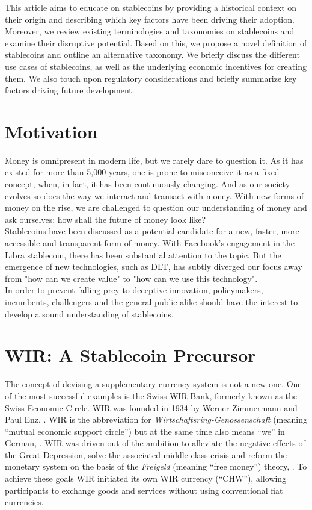 \documentclass[conference]{IEEEtran}
\begin{document}
This article aims to educate on stablecoins by providing a historical context on their origin and describing  which key factors have been driving their adoption. Moreover, we review existing terminologies and taxonomies on stablecoins and examine their disruptive potential. Based on this, we propose a novel definition of stablecoins and outline an alternative taxonomy. We briefly discuss the different use cases of stablecoins, as well as the underlying economic incentives for creating them. We also touch upon regulatory considerations and briefly summarize key factors driving future development.

\section{Motivation}
Money is omnipresent in modern life, but we rarely dare to question it. As it has existed for more than 5,000 years, one is prone to misconceive it as a fixed concept, when, in fact, it has been continuously changing. And as our society evolves so does the way we interact and transact with money. With new forms of money on the rise, we are challenged to question our understanding of money and ask ourselves: how shall the future of money look like?\\

Stablecoins have been discussed as a potential candidate for a new, faster, more accessible and transparent form of money. With Facebook's engagement in the Libra stablecoin, there has been substantial attention to the topic. But the emergence of new technologies, such as \ac{DLT}, has subtly diverged our focus away from "how can we create value" to "how can we use this technology".\\

In order to prevent falling prey to deceptive innovation, policymakers, incumbents, challengers and the general public alike should have the interest to develop a sound understanding of stablecoins. 

\section{WIR: A Stablecoin Precursor}
The concept of devising a supplementary currency system is not a new one. One of the most successful examples is the Swiss WIR Bank, formerly known as the Swiss Economic Circle. WIR was founded in 1934 by Werner Zimmermann and Paul Enz, \cite{Orell}. WIR is the abbreviation for \textit{Wirtschaftsring-Genossenschaft} (meaning ``mutual economic support circle'') but at the same time also means ``we'' in German, \cite{Gimigliano}. WIR was driven out of the ambition to alleviate the negative effects of the Great Depression, solve the associated middle class crisis and reform the monetary system on the basis of the \textit{Freigeld} (meaning ``free money'') theory, \cite{Vuillaume}. To achieve these goals WIR initiated its own WIR currency (``CHW''), allowing participants to exchange goods and services without using conventional fiat currencies.
\end{document}
